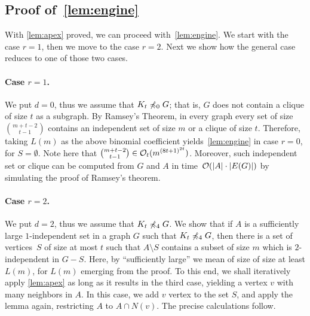 
\subsection{Proof of~\cref{lem:engine}}
\label{sec:engine}

With \cref{lem:apex} proved, we can proceed with~\cref{lem:engine}. 
We start with the case $r=1$, then we move to the case $r=2$. 
Next we show how the general case reduces to one of those two cases.

\paragraph{Case $r=1$.}
We put $d=0$, thus we assume that $K_t\not\preccurlyeq_0 G$; that is, $G$ does not contain a clique of size $t$ as a subgraph. By Ramsey's Theorem, in every graph every set of size $\binom{m+t-2}{t-1}$ contains an
independent set of size $m$ or a clique of size $t$. Therefore, 
taking $L(m)$ as the above binomial coefficient yields~\cref{lem:engine} in case $r=0$, for $S=\emptyset$. Note here that $\binom{m+t-2}{t-1}\in\mathcal{O}_{t}{(m^{{(8t+1)}^{2t}})}$.
Moreover, such independent set or clique can be computed from $G$ and $A$ in time~$\mathcal{O}(|A|\cdot |E(G)|)$ by simulating the proof of Ramsey's theorem.

\paragraph{Case $r=2$.}
We put $d=2$, thus we assume that $K_t\not\preccurlyeq_4 G$.
We show that if $A$ is a sufficiently large $1$-independent set in a graph $G$ such that $K_t\not\preccurlyeq_4 G$, 
then there is a set of vertices~$S$ of size at most $t$ such that $A\setminus S$ contains a subset of size $m$ which is $2$-independent in $G-S$. 
Here, by ``sufficiently large'' we mean of size of size at least $L(m)$, for $L(m)$ emerging from the proof.
To this end, we shall iteratively apply \cref{lem:apex} as long as  it results in the third case, 
yielding a vertex $v$ with many neighbors in $A$. In this case, we add $v$ vertex to the set $S$, and apply the lemma again,
restricting $A$ to $A\cap N(v)$. 
The precise calculations follow.

